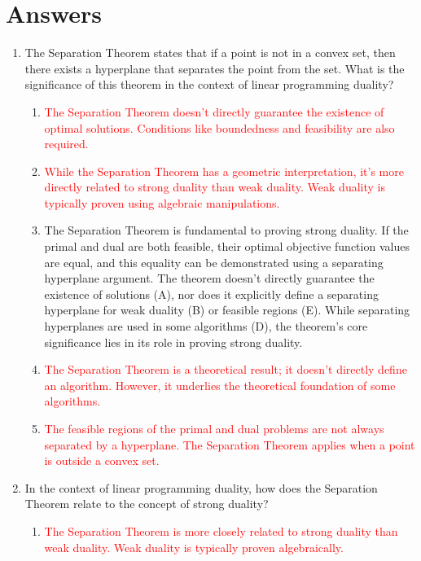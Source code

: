 \documentclass{article}%
\newcommand{\incorrect}[1]{\textcolor{red}{#1}}
\begin{document}
\section{Answers}%
\label{sec:Answers}%
\begin{enumerate}%
\item The Separation Theorem states that if a point is not in a convex set, then there exists a hyperplane that separates the point from the set.  What is the significance of this theorem in the context of linear programming duality?%
\begin{enumerate}%
\item \incorrect{The Separation Theorem doesn't directly guarantee the existence of optimal solutions.  Conditions like boundedness and feasibility are also required.}%
\item \incorrect{While the Separation Theorem has a geometric interpretation, it's more directly related to strong duality than weak duality. Weak duality is typically proven using algebraic manipulations.}%
\item The Separation Theorem is fundamental to proving strong duality.  If the primal and dual are both feasible, their optimal objective function values are equal, and this equality can be demonstrated using a separating hyperplane argument.  The theorem doesn't directly guarantee the existence of solutions (A), nor does it explicitly define a separating hyperplane for weak duality (B) or feasible regions (E). While separating hyperplanes are used in some algorithms (D), the theorem's core significance lies in its role in proving strong duality.%
\item \incorrect{The Separation Theorem is a theoretical result; it doesn't directly define an algorithm.  However, it underlies the theoretical foundation of some algorithms.}%
\item \incorrect{The feasible regions of the primal and dual problems are not always separated by a hyperplane.  The Separation Theorem applies when a point is outside a convex set.}%
\end{enumerate}%
\vspace{1em}%
\item In the context of linear programming duality, how does the Separation Theorem relate to the concept of strong duality?%
\begin{enumerate}%
\item \incorrect{The Separation Theorem is more closely related to strong duality than weak duality. Weak duality is typically proven algebraically.}%

\end{enumerate}
\end{enumerate}
\end{document}
